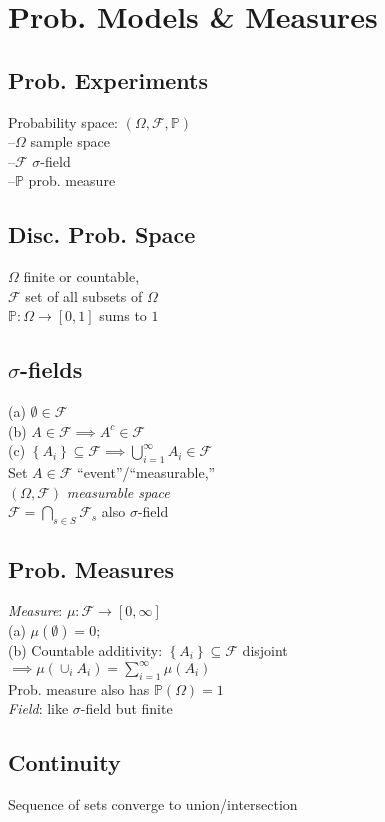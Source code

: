 \section{Prob. Models \& Measures}

	\subsection*{Prob. Experiments}
	Probability space: $\left(\Omega, \mathcal{F}, \mathbb{P}\right)$\\
	--$\Omega$ sample space\\
	--$\mathcal{F}$ $\sigma$-field\\
	--$\mathbb{P}$ prob. measure\\
	
	\subsection*{Disc. Prob. Space}
	$\Omega$ finite or countable,\\
	$\mathcal{F}$ set of all subsets of $\Omega$\\
	$\mathbb{P}: \Omega\to\left[0, 1\right]$ sums to $1$
	
	\subsection*{$\sigma$-fields}
	(a) $\emptyset\in\mathcal{F}$\\
	(b) $A\in\mathcal{F}\implies A^{c}\in\mathcal{F}$\\
	(c) $\left\{A_{i}\right\}\subseteq\mathcal{F}\implies\bigcup_{i=1}^{\infty}A_{i}\in\mathcal{F}$\\
	Set $A\in\mathcal{F}$ ``event''/``measurable,''\\
	$\left(\Omega, \mathcal{F}\right)$ \emph{measurable space}\\
	$\mathcal{F} = \bigcap_{s\in S}\mathcal{F}_{s}$ also $\sigma$-field
	
	\subsection*{Prob. Measures}
	\emph{Measure}: $\mu: \mathcal{F}\to\left[0, \infty\right]$\\
	(a) $\mu\left(\emptyset\right) = 0$;\\
	(b) Countable additivity: $\left\{A_{i}\right\}\subseteq\mathcal{F}$ disjoint\\
	$\implies\mu\left(\cup_{i}A_{i}\right) = \sum_{i = 1}^{\infty}\mu\left(A_{i}\right)$\\
	Prob. measure also has $\mathbb{P}\left(\Omega\right) = 1$\\
	\emph{Field}: like $\sigma$-field but finite
	
	\subsection*{Continuity}
	Sequence of sets converge to union/intersection
	